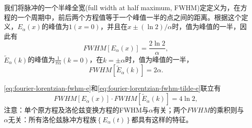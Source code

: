 我们将脉冲的一个半峰全宽(full width at half maximum, FWHM)定定义为，在方程的一个周期中，前后两个方程值等于一个峰值一半的点之间的距离。根据这个定义，$E_{\alpha}(x)$的峰值为$1(x=0)$，并且在$x \pm (\ln 2) / \alpha$时，值为峰值的一半，因此有
\begin{equation}
  \label{eq:fourier-lorentzian-fwhm-e}
  FWHM \left[ E_{\alpha} (x) \right] = \frac{2 \ln 2}{\alpha},
  \end{equation}
$\widetilde{E}_{\alpha}(k)$的峰值为$\frac{1}{\pi \alpha} (k = 0)$，在$k = \pm \alpha$时，值为峰值的一半，
\begin{equation}
    \label{eq:fourier-lorentzian-fwhm-tilde-e}
    FWHM \left[ \widetilde{E}_{\alpha}(k) \right] = 2 \alpha.
\end{equation}

\eqref{eq:fourier-lorentzian-fwhm-e}和\eqref{eq:fourier-lorentzian-fwhm-tilde-e}联立有
\begin{equation}
  \label{eq:fourier-lorentzian-fwhm-product}
  FWHM \left[ E_{\alpha} (x) \right] \cdot FWHM \left[ \widetilde{E}_{\alpha}(k) \right] = 4 \ln 2,
\end{equation}
注意：单个原方程及洛伦兹变换方程的FWHM与$\alpha$有关；两个$FWHM$的乘积则与$\alpha$无关：所有洛伦兹脉冲方程族$\left\{ E_{\alpha}(t) \right\}$都具有这样的特征。


